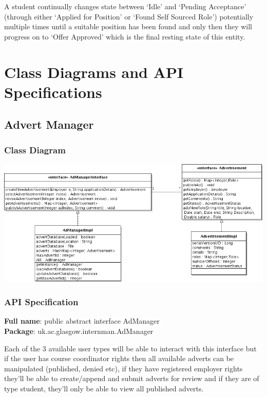 \documentclass[11pt]{l3deliverable}
\begin{document}
A student continually changes state between `Idle' and `Pending
Acceptance' (through either `Applied for Position' or `Found Self
Sourced Role') potentially multiple times until a suitable position
has been found and only then they will progress on to `Offer
Approved' which is the final resting state of this entity.

\newpage

\section{Class Diagrams and API Specifications}

\subsection{Advert Manager}

\subsubsection{Class Diagram}

\includegraphics[width=\textwidth]{adManagerClassDiagram.png}

\subsubsection{API Specification}

\textbf{Full name}: public abstract interface AdManager\\

\textbf{Package}: uk.ac.glasgow.internman.AdManager

Each of the 3 available user types will be able to interact with this interface
but if the user has course coordinator rights then all available adverts can be
manipulated (published, denied etc), if they have registered employer rights
they'll be able to create/append and submit adverts for review and if they are
of type student, they'll only be able to view all published adverts.
\end{document}
